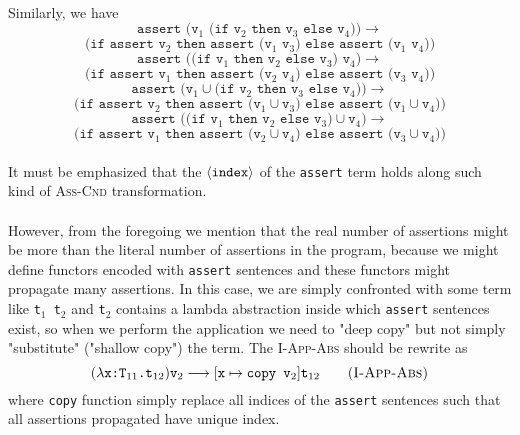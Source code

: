 \documentclass[a4paper]{article}
\begin{document}
\paragraph{}
Similarly, we have
$$
	\texttt{assert (v$_1$ (if v$_2$ then v$_3$ else v$_4$))}\longrightarrow
$$
\begin{equation}
	\texttt{(if assert v$_2$ then assert (v$_1$ v$_3$) else assert (v$_1$ v$_4$))}
	\tag{\sc I-Ass-Cnd-App-Trans1}
\end{equation}
$$
	\texttt{assert ((if v$_1$ then v$_2$ else v$_3$) v$_4$)}\longrightarrow
$$
\begin{equation}
	\texttt{(if assert v$_1$ then assert (v$_2$ v$_4$) else assert (v$_3$ v$_4$))}
	\tag{\sc I-Ass-Cnd-App-Trans2}
\end{equation}
$$
	\texttt{assert (v$_1$$\cup$(if v$_2$ then v$_3$ else v$_4$))}\longrightarrow
$$
\begin{equation}
	\texttt{(if assert v$_2$ then assert (v$_1$$\cup$v$_3$) else assert (v$_1$$\cup$v$_4$))}
	\tag{\sc I-Ass-Cnd-Union-Trans1}
\end{equation}
$$
	\texttt{assert ((if v$_1$ then v$_2$ else v$_3$)$\cup$v$_4$)}\longrightarrow
$$
\begin{equation}
	\texttt{(if assert v$_1$ then assert (v$_2$$\cup$v$_4$) else assert (v$_3$$\cup$v$_4$))}
	\tag{\sc I-Ass-Cnd-Union-Trans2}
\end{equation}
\paragraph{}
It must be emphasized that the $\langle\text{\tt index}\rangle$ of the \texttt{assert} term holds along such kind of \textsc{Ass-Cnd} transformation.
\paragraph{}
However, from the foregoing we mention that the real number of assertions might be more than the literal number of assertions in the program, because we might define functors encoded with \texttt{assert} sentences and these functors might propagate many assertions. In this case, we are simply confronted with some term like \texttt{t$_1$ t$_2$} and \texttt{t$_2$} contains a lambda abstraction inside which \texttt{assert} sentences exist, so when we perform the application we need to "deep copy" but not simply "substitute" ("shallow copy") the term. The \textsc{I-App-Abs} should be rewrite as
\begin{equation}
	(\lambda\text{\tt x:T$_{11}$.t$_{12}$})\text{\tt v}_2\longrightarrow[\text{\tt x}\mapsto\text{\tt copy }\text{\tt v}_2]\text{\tt t}_{12}\tag{\sc I-App-Abs}
\end{equation}
where \texttt{copy} function simply replace all indices of the \texttt{assert} sentences such that all assertions propagated have unique index.
\end{document}
